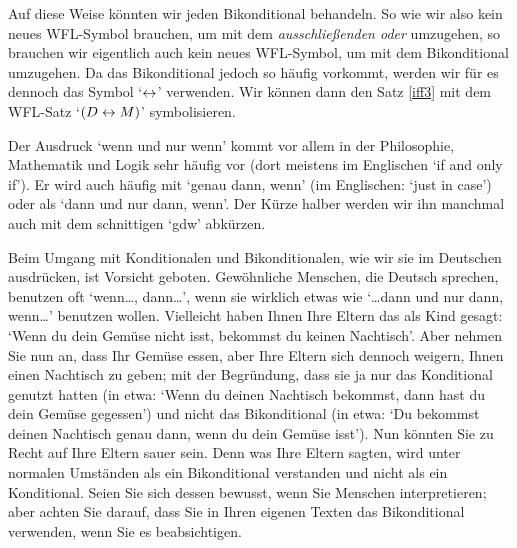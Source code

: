 
Auf diese Weise könnten wir jeden Bikonditional behandeln. So wie wir also kein neues WFL-Symbol brauchen, um mit dem \emph{ausschlie{\ss}enden oder} umzugehen, so brauchen wir eigentlich auch kein neues WFL-Symbol, um mit dem Bikonditional umzugehen. Da das Bikonditional jedoch so häufig vorkommt, werden wir für es dennoch das Symbol `$\leftrightarrow$' verwenden. Wir können dann den Satz \ref{iff3} mit dem WFL-Satz `$(D \leftrightarrow M)$' symbolisieren. 

Der Ausdruck `wenn und nur wenn' kommt vor allem in der Philosophie, Mathematik und Logik sehr häufig vor (dort meistens im Englischen `if and only if'). Er wird auch häufig mit `genau dann, wenn' (im Englischen: `just in case') oder als `dann und nur dann, wenn'. Der Kürze halber werden wir ihn manchmal auch mit dem schnittigen `gdw' abkürzen. 


Beim Umgang mit Konditionalen und Bikonditionalen, wie wir sie im Deutschen ausdrücken, ist Vorsicht geboten. Gewöhnliche Menschen, die Deutsch sprechen, benutzen oft `wenn\dots, dann\dots', wenn sie wirklich etwas wie `\dots dann und nur dann, wenn\dots' benutzen wollen. Vielleicht haben Ihnen Ihre Eltern das als Kind gesagt: `Wenn du dein Gemüse nicht isst, bekommst du keinen Nachtisch'. Aber nehmen Sie nun an, dass Ihr Gemüse essen, aber Ihre Eltern sich dennoch weigern, Ihnen einen Nachtisch zu geben; mit der Begründung, dass sie ja nur das Konditional genutzt hatten (in etwa: `Wenn du deinen Nachtisch bekommst, dann hast du dein Gemüse gegessen') und nicht das Bikonditional (in etwa: `Du bekommst deinen Nachtisch genau dann, wenn du dein Gemüse isst'). Nun könnten Sie zu Recht auf Ihre Eltern sauer sein. Denn was Ihre Eltern sagten, wird unter normalen Umständen als ein Bikonditional verstanden und nicht als ein Konditional. Seien Sie sich dessen bewusst, wenn Sie Menschen interpretieren; aber achten Sie darauf, dass Sie in Ihren eigenen Texten das Bikonditional verwenden, wenn Sie es beabsichtigen.

